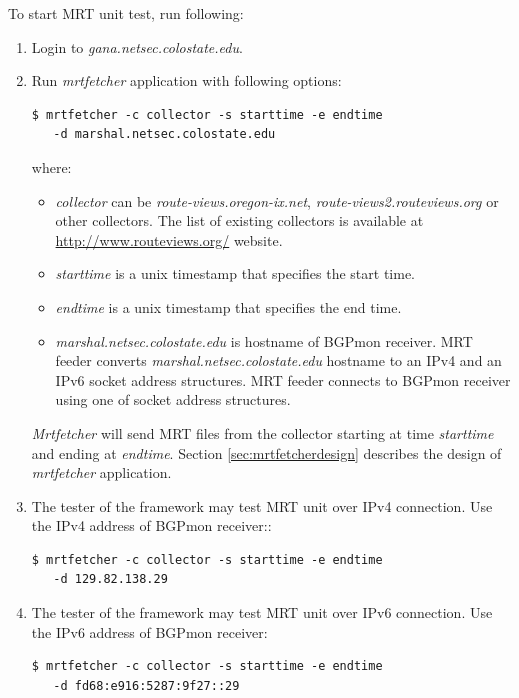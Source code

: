 


To start MRT unit test, run following: 

\begin{enumerate}
  \item{Login to \emph{gana.netsec.colostate.edu}.}
  \item{Run \emph{mrtfetcher} application with following options: }
\begin{verbatim}
$ mrtfetcher -c collector -s starttime -e endtime 
   -d marshal.netsec.colostate.edu
\end{verbatim}
  where:  
  \begin{itemize}
  \item{\emph{collector} can be  \emph{route-views.oregon-ix.net}, \emph{route-views2.routeviews.org} or other collectors. The list of existing collectors is available at \url{http://www.routeviews.org/} website.}
  \item{\emph{starttime} is a unix timestamp that specifies the start time.}
  \item{\emph{endtime} is a unix timestamp that specifies the end time.}
  \item{\emph{marshal.netsec.colostate.edu} is hostname of  BGPmon receiver. MRT feeder converts
\emph{marshal.netsec.colostate.edu} hostname to an IPv4 and an IPv6 socket address structures. MRT feeder connects to BGPmon receiver using one of socket address structures. }
  \end{itemize}
  \emph{Mrtfetcher}  will send MRT files from the collector starting at time \emph{starttime} and ending at \emph{endtime}. Section \ref{sec:mrtfetcherdesign} describes the design of \emph{mrtfetcher} application.
  \item{The tester of the framework may test MRT unit over IPv4 connection. Use the IPv4 address of BGPmon receiver::   }
\begin{verbatim}
$ mrtfetcher -c collector -s starttime -e endtime 
   -d 129.82.138.29
\end{verbatim} 
  \item{The tester of the framework may test MRT unit over IPv6 connection. Use the IPv6 address of BGPmon receiver:}
\begin{verbatim}
$ mrtfetcher -c collector -s starttime -e endtime 
   -d fd68:e916:5287:9f27::29
\end{verbatim}    
  

\end{enumerate}
